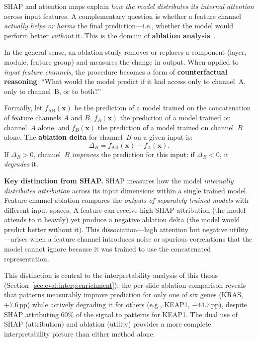 SHAP and attention maps explain \emph{how the model distributes its
internal attention} across input features.
A complementary question is whether a feature channel
\emph{actually helps or harms} the final prediction---i.e., whether
the model would perform better \emph{without} it.
This is the domain of \textbf{ablation analysis}~\cite{meyes2019ablation}.

In the general sense, an ablation study removes or replaces a
component (layer, module, feature group) and measures the change in
output.
When applied to \emph{input feature channels}, the procedure becomes
a form of \textbf{counterfactual reasoning}: ``What would the model
predict if it had access only to channel~A, only to channel~B, or
to both?''

Formally, let $f_{\text{AB}}(\mathbf{x})$ be the prediction of a
model trained on the concatenation of feature channels $A$ and $B$,
$f_A(\mathbf{x})$ the prediction of a model trained on channel~$A$
alone, and $f_B(\mathbf{x})$ the prediction of a model trained on
channel~$B$ alone.
The \textbf{ablation delta} for channel~$B$ on a given input is:
\begin{equation}
\label{eq:ablation_delta}
\Delta_B = f_{\text{AB}}(\mathbf{x}) - f_A(\mathbf{x}).
\end{equation}
If $\Delta_B > 0$, channel~$B$ \emph{improves} the prediction for
this input; if $\Delta_B < 0$, it \emph{degrades} it.

\textbf{Key distinction from SHAP.}
SHAP measures how the model \emph{internally distributes attribution}
across its input dimensions within a single trained model.
Feature channel ablation compares the \emph{outputs of separately
trained models} with different input spaces.
A feature can receive high SHAP attribution (the model attends to it
heavily) yet produce a negative ablation delta (the model would
predict better without it).
This dissociation---high attention but negative utility---arises when
a feature channel introduces noise or spurious correlations that the
model cannot ignore because it was trained to use the concatenated
representation.

This distinction is central to the interpretability analysis of this
thesis (Section~\ref{sec:eval:interp:enrichment}): the per-slide
ablation comparison reveals that patterns measurably improve
prediction for only one of six genes (KRAS, $+7.6$\,pp) while
actively degrading it for others (e.g., KEAP1, $-44.7$\,pp), despite
SHAP attributing 60\% of the signal to patterns for KEAP1.
The dual use of SHAP (attribution) and ablation (utility) provides a
more complete interpretability picture than either method alone.


